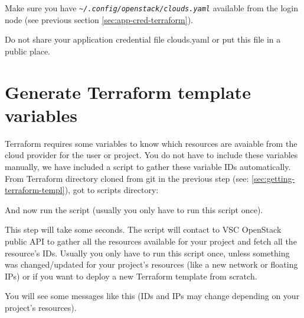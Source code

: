 \begin{prompt}
\end{prompt}

Make sure you have \texttt{\emph{\~\//.config/openstack/clouds.yaml}} available from the login node (see previous section \ref{sec:app-cred-terraform}).

 Do not share your application credential file clouds.yaml or put this file in a public place.

\begin{prompt}
\end{prompt}

\section{Generate Terraform template variables}\label{sec:generate-terraform-variables}
\gls{Terraform} requires some variables to know which resources are avaiable from the cloud provider for the user or project.
You do not have to include these variables manually, we have included a script to gather these variable IDs automatically.
From Terraform directory cloned from git in the previous step (see: \ref{sec:getting-terraform-templ}), got to scripts directory:

\begin{prompt}
\end{prompt}

And now run the script (usually you only have to run this script once).

\begin{prompt}
\end{prompt}

This step will take some seconds. The script will contact to VSC OpenStack public API to gather all the resources available for your project and fetch all the resource's IDs.
Usually you only have to run this script once, unless something was changed/updated for your project's resources (like a new network or floating IPs) or if you want to deploy a new
Terraform template from scratch.

You will see some messages like this (IDs and IPs may change depending on your project's resources).

